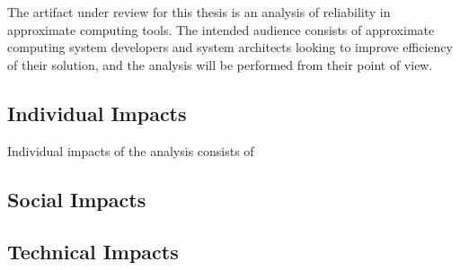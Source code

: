 The artifact under review for this thesis is an analysis of reliability in approximate computing tools. The intended audience consists of approximate computing system developers and system architects looking to improve efficiency of their solution, and the analysis will be performed from their point of view. 

\subsection{Individual Impacts}
Individual impacts of the analysis consists of 
\subsection{Social Impacts}

\subsection{Technical Impacts}

